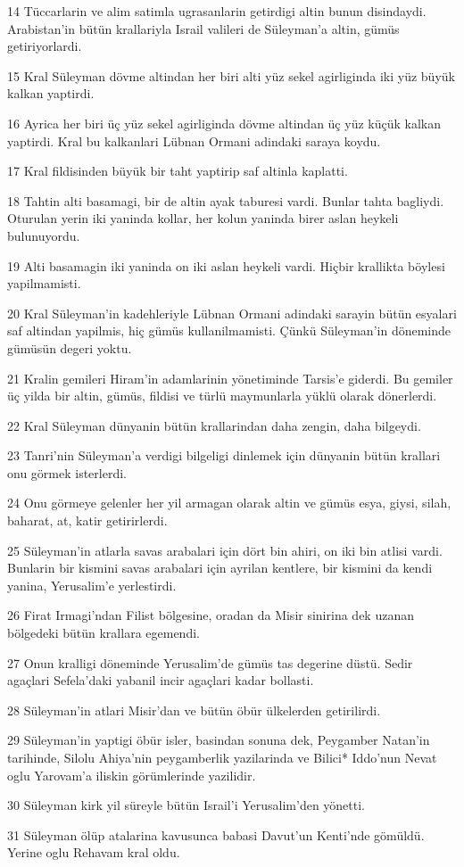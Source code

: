 \par 14 Tüccarlarin ve alim satimla ugrasanlarin getirdigi altin bunun disindaydi. Arabistan'in bütün krallariyla Israil valileri de Süleyman'a altin, gümüs getiriyorlardi.
\par 15 Kral Süleyman dövme altindan her biri alti yüz sekel agirliginda iki yüz büyük kalkan yaptirdi.
\par 16 Ayrica her biri üç yüz sekel agirliginda dövme altindan üç yüz küçük kalkan yaptirdi. Kral bu kalkanlari Lübnan Ormani adindaki saraya koydu.
\par 17 Kral fildisinden büyük bir taht yaptirip saf altinla kaplatti.
\par 18 Tahtin alti basamagi, bir de altin ayak taburesi vardi. Bunlar tahta bagliydi. Oturulan yerin iki yaninda kollar, her kolun yaninda birer aslan heykeli bulunuyordu.
\par 19 Alti basamagin iki yaninda on iki aslan heykeli vardi. Hiçbir krallikta böylesi yapilmamisti.
\par 20 Kral Süleyman'in kadehleriyle Lübnan Ormani adindaki sarayin bütün esyalari saf altindan yapilmis, hiç gümüs kullanilmamisti. Çünkü Süleyman'in döneminde gümüsün degeri yoktu.
\par 21 Kralin gemileri Hiram'in adamlarinin yönetiminde Tarsis'e giderdi. Bu gemiler üç yilda bir altin, gümüs, fildisi ve türlü maymunlarla yüklü olarak dönerlerdi.
\par 22 Kral Süleyman dünyanin bütün krallarindan daha zengin, daha bilgeydi.
\par 23 Tanri'nin Süleyman'a verdigi bilgeligi dinlemek için dünyanin bütün krallari onu görmek isterlerdi.
\par 24 Onu görmeye gelenler her yil armagan olarak altin ve gümüs esya, giysi, silah, baharat, at, katir getirirlerdi.
\par 25 Süleyman'in atlarla savas arabalari için dört bin ahiri, on iki bin atlisi vardi. Bunlarin bir kismini savas arabalari için ayrilan kentlere, bir kismini da kendi yanina, Yerusalim'e yerlestirdi.
\par 26 Firat Irmagi'ndan Filist bölgesine, oradan da Misir sinirina dek uzanan bölgedeki bütün krallara egemendi.
\par 27 Onun kralligi döneminde Yerusalim'de gümüs tas degerine düstü. Sedir agaçlari Sefela'daki yabanil incir agaçlari kadar bollasti.
\par 28 Süleyman'in atlari Misir'dan ve bütün öbür ülkelerden getirilirdi.
\par 29 Süleyman'in yaptigi öbür isler, basindan sonuna dek, Peygamber Natan'in tarihinde, Silolu Ahiya'nin peygamberlik yazilarinda ve Bilici* Iddo'nun Nevat oglu Yarovam'a iliskin görümlerinde yazilidir.
\par 30 Süleyman kirk yil süreyle bütün Israil'i Yerusalim'den yönetti.
\par 31 Süleyman ölüp atalarina kavusunca babasi Davut'un Kenti'nde gömüldü. Yerine oglu Rehavam kral oldu.

